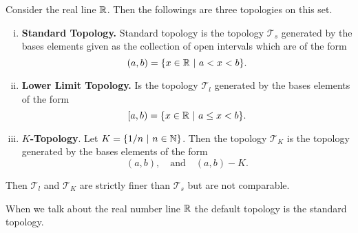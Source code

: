 \begin{proposition}
	Consider the real line $ \mathbb{R} $. Then the followings are three topologies on this set.
	\begin{enumerate}[(i)]
		\item \textbf{Standard Topology.} Standard topology is the topology $ \mathcal{T}_s $ generated by the bases elements given as the collection of open intervals which are of the form
		\[ (a,b) = \{x \in \mathbb{R}\ |\ a<x<b\}. \]
		\item \textbf{Lower Limit Topology.} Is the topology $ \mathcal{T}_l $ generated by the bases elements of the form
		\[ [a,b) = \{x \in \mathbb{R}\ |\ a\leq x < b\}. \]
		\item \textbf{$K$-Topology}. Let $ K = \{1/n\ |\ n \in \mathbb{N}\} $. Then the topology $ \mathcal{T}_K $ is the topology generated by the bases elements of the form
		\[ (a,b), \quad\text{and}\quad (a,b) - K. \]
	\end{enumerate}
	Then $ \mathcal{T}_l $ and $ \mathcal{T}_K $ are strictly finer than $ \mathcal{T}_s $ but are not comparable.
\end{proposition}
\begin{remark}
	When we talk about the real number line $ \mathbb{R} $ the default topology is the standard topology.
\end{remark}
